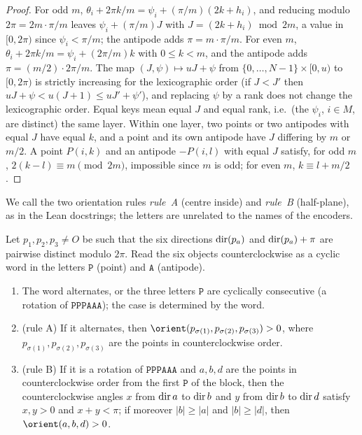 \begin{proof}
For odd $m$, $\theta_i+2\pi k/m=\psi_i+(\pi/m)(2k+h_i)$, and reducing modulo $2\pi=2m\cdot\pi/m$ leaves
$\psi_i+(\pi/m)J$ with $J=(2k+h_i)\bmod2m$, a value in $[0,2\pi)$ since $\psi_i<\pi/m$; the antipode adds
$\pi=m\cdot\pi/m$. For even $m$, $\theta_i+2\pi k/m=\psi_i+(2\pi/m)k$ with $0\le k<m$, and the antipode adds
$\pi=(m/2)\cdot2\pi/m$. The map $(J,\psi)\mapsto uJ+\psi$ from $\{0,\dots,N-1\}\times[0,u)$ to $[0,2\pi)$ is strictly
increasing for the lexicographic order (if $J<J'$ then $uJ+\psi<u(J+1)\le uJ'+\psi'$), and replacing $\psi$ by a rank
does not change the lexicographic order. Equal keys mean equal $J$ and equal rank, i.e.\ (the $\psi_i$, $i\in M$, are
distinct) the same layer.
Within one layer, two points or two antipodes with equal $J$ have equal $k$, and a point and its own antipode have $J$ differing by $m$ or $m/2$. A point $P(i,k)$ and an antipode
$-P(i,l)$ with equal $J$ satisfy, for odd $m$, $2(k-l)\equiv m\pmod{2m}$, impossible since $m$ is odd; for even $m$,
$k\equiv l+m/2$.
\end{proof}

We call the two orientation rules \emph{rule~A} (centre inside) and \emph{rule~B} (half-plane), as in the Lean
docstrings; the letters are unrelated to the names of the encoders.

\begin{lemma}\label{k8s:lem:dich}
Let $p_1,p_2,p_3\ne O$ be such that the six directions $\operatorname{dir}(p_a)$ and $\operatorname{dir}(p_a)+\pi$ are pairwise distinct modulo
$2\pi$. Read the six objects counterclockwise as a cyclic word in the letters $\mathtt P$ (point) and $\mathtt A$
(antipode).
\begin{enumerate}[label=(\alph*)]
\item The word alternates, or the three letters $\mathtt P$ are cyclically consecutive (a rotation of
$\mathtt{PPPAAA}$); the case is determined by the word.
\item (rule A) If it alternates, then $\orient(p_{\sigma(1)},p_{\sigma(2)},p_{\sigma(3)})>0$, where
$p_{\sigma(1)},p_{\sigma(2)},p_{\sigma(3)}$ are the points in counterclockwise order.
\item (rule B) If it is a rotation of $\mathtt{PPPAAA}$ and $a,b,d$ are the points in counterclockwise order from the
first $\mathtt P$ of the block, then the counterclockwise angles $x$ from $\operatorname{dir} a$ to $\operatorname{dir} b$ and $y$ from $\operatorname{dir} b$ to
$\operatorname{dir} d$ satisfy $x,y>0$ and $x+y<\pi$; if moreover $|b|\ge|a|$ and $|b|\ge|d|$, then $\orient(a,b,d)>0$.
\end{enumerate}
\end{lemma}

